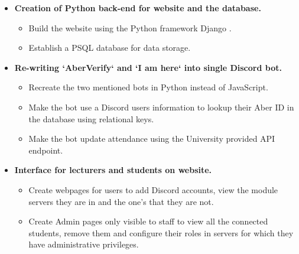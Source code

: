 \begin{itemize}
	\item \textbf{Creation of Python back-end for website and the database.}
	\begin{itemize}
		\item Build the website using the Python framework Django \cite{Django}.
		\item Establish a PSQL \cite{psql} database for data storage.
	\end{itemize}
	
	\item \textbf{Re-writing `AberVerify` and `I am here` into single Discord bot.}
	\begin{itemize}
		\item Recreate the two mentioned bots in Python instead of JavaScript.
		\item Make the bot use a Discord users information to lookup their Aber ID in the database using relational keys.
		\item Make the bot update attendance using the University provided API endpoint.
	\end{itemize}
	
	\item \textbf{Interface for lecturers and students on website.}
	\begin{itemize}
		\item Create webpages for users to add Discord accounts, view the module servers they are in and the one's that they are not. 
		\item Create Admin pages only visible to staff to view all the connected students, remove them and configure their roles in servers for which they have administrative privileges.
	\end{itemize}
	

\end{itemize}
